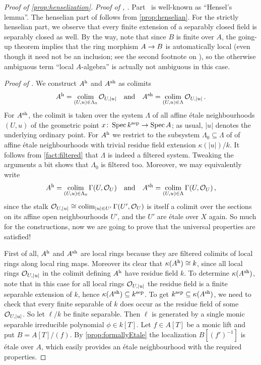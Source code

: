 \begin{proof}[Proof of \cref{prop:henselization}]
	\emph{Proof of , .} Part~ is well-known as \enquote{Hensel's lemma}. The henselian part of  follows from \cref{prop:henselian}. For the strictly henselian part, we observe that every finite extension of a separably closed field is separably closed as well. By the way, note that since $B$ is finite over $A$, the going-up theorem implies that the ring morphism $A\morphism B$ is automatically local (even though it need not be an inclusion; see the second footnote on ), so the otherwise ambiguous term \enquote{local $A$-algebra} is actually not ambiguous in this case. 
	
	\emph{Proof of .} We construct $A^{\mathrm{h}}$ and $A^{\mathrm{sh}}$ as colimits
	\begin{equation}\label{eq:AhColim1}
		A^{\mathrm{h}}=\operatorname*{colim}_{(U,u)\in \Lambda_0}\mathcal{O}_{U,|u|}\quad\text{and}\quad A^{\mathrm{sh}}=\operatorname*{colim}_{(U,u)\in\Lambda} \mathcal{O}_{U,|u|}\,.
	\end{equation}
	For $A^{\mathrm{sh}}$, the colimit is taken over the system $\Lambda$ of all affine étale neighbourhoods $(U,u)$ of the geometric point $x\colon \Spec k^\sep\morphism \Spec A$; as usual, $|u|$ denotes the underlying ordinary point. For $A^{\mathrm{h}}$ we restrict to the subsystem $\Lambda_0\subseteq \Lambda$ of of affine étale neighbourhoods with trivial residue field extension $\kappa(|u|)/k$. It follows from \cref{fact:filtered} that $\Lambda$ is indeed a filtered system. Tweaking the arguments a bit shows that $\Lambda_0$ is filtered too. Moreover, we may equivalently write 
	\begin{equation}\label{eq:AhColim2}
		A^{\mathrm{h}}=\operatorname*{colim}_{(U,u)\in\Lambda_0}\operatorname{\Gamma}(U,\mathcal{O}_U)\quad\text{and}\quad A^{\mathrm{sh}}=\operatorname*{colim}_{(U,u)\in\Lambda}\operatorname{\Gamma}(U,\mathcal{O}_U)\,,
	\end{equation}
	since the stalk $\mathcal{O}_{U,|u|}\cong \operatorname*{colim}_{|u|\in U'}\operatorname{\Gamma}(U',\mathcal{O}_U)$ is itself a colimit over the sections on its affine open neighbourhoods $U'$, and the $U'$ are étale over $X$ again. So much for the constructions, now we are going to prove that the universal properties are satisfied!
	
	First of all, $A^{\mathrm{h}}$ and $A^{\mathrm{sh}}$ are local rings because they are filtered colimits of local rings along local ring maps. Moreover its clear that $\kappa(A^{\mathrm{h}})\cong k$, since all local rings $\mathcal{O}_{U,|u|}$ in the colimit defining $A^{\mathrm{h}}$ have residue field $k$. To determine $\kappa(A^{\mathrm{sh}})$, note that in this case for all local rings $\mathcal{O}_{U,|u|}$ the residue field is a finite separable extension of $k$, hence $\kappa(A^{\mathrm{sh}})\subseteq k^{\mathrm{sep}}$. To get $k^{\mathrm{sep}}\subseteq \kappa(A^{\mathrm{sh}})$, we need to check that every finite separable of $k$ does occur as the residue field of some $\mathcal{O}_{U,|u|}$. So let $\ell/k$ be finite separable. Then $\ell$ is generated by a single monic separable irreducible polynomial $\phi\in k[T]$. Let $f\in A[T]$ be a monic lift and put $B=A[T]/(f)$. By \cref{prop:formallyEtale} the localization $B[(f')^{-1}]$ is étale over $A$, which easily provides an étale neighbourhood with the required properties.
	

\end{proof}

